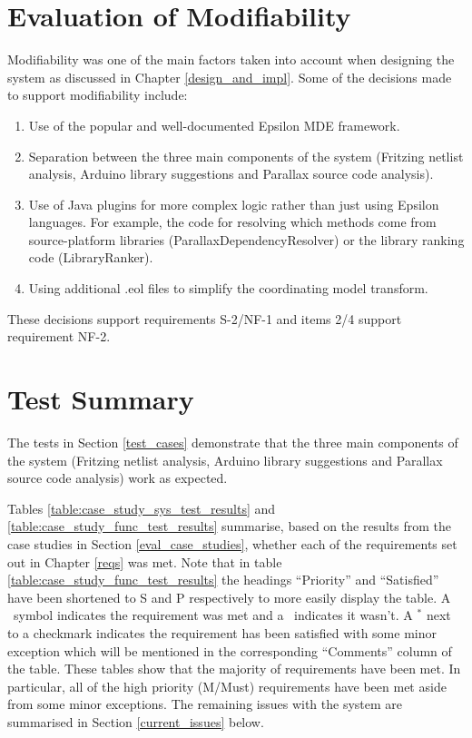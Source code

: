 \documentclass{UoYCSproject}
\newcommand{\xmark}{\ding{55}}%
\renewcommand{\checkmark}{\ding{51}}
\begin{document}
\section{Evaluation of Modifiability} \label{eval_modifiability}
Modifiability was one of the main factors taken into account when designing the system as discussed in Chapter \ref{design_and_impl}. Some of the decisions made to support modifiability include:
\begin{enumerate}
\item Use of the popular and well-documented Epsilon MDE framework.
\item Separation between the three main components of the system (Fritzing netlist analysis, Arduino library suggestions and Parallax source code analysis).
\item Use of Java plugins for more complex logic rather than just using Epsilon languages. For example, the code for resolving which methods come from source-platform libraries (ParallaxDependencyResolver) or the library ranking code (LibraryRanker).
\item Using additional .eol files to simplify the coordinating model transform.
\end{enumerate}
These decisions support requirements S-2/NF-1 and items 2/4 support requirement NF-2. 

\section{Test Summary} \label{test_summary}
The tests in Section \ref{test_cases} demonstrate that the three main components of the system (Fritzing netlist analysis, Arduino library suggestions and Parallax source code analysis) work as expected.

Tables \ref{table:case_study_sys_test_results} and \ref{table:case_study_func_test_results} summarise, based on the results from the case studies in Section \ref{eval_case_studies}, whether each of the requirements set out in Chapter \ref{reqs} was met. Note that in table \ref{table:case_study_func_test_results} the headings ``Priority'' and ``Satisfied'' have been shortened to S and P respectively to more easily display the table. A \checkmark \ symbol indicates the requirement was met and a \xmark \ indicates it wasn't. A $^*$ next to a checkmark indicates the requirement has been satisfied with some minor exception which will be mentioned in the corresponding ``Comments'' column of the table.
These tables show that the majority of requirements have been met. In particular, all of the high priority (M/Must) requirements have been met aside from some minor exceptions. The remaining issues with the system are summarised in Section \ref{current_issues} below.
\end{document}
